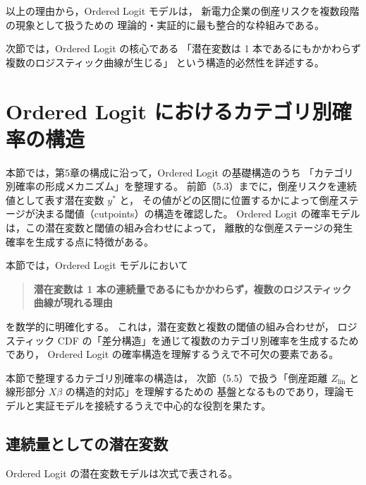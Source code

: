 以上の理由から，Ordered Logit モデルは，
新電力企業の倒産リスクを複数段階の現象として扱うための
理論的・実証的に最も整合的な枠組みである。

次節では，Ordered Logit の核心である
「潜在変数は 1 本であるにもかかわらず複数のロジスティック曲線が生じる」
という構造的必然性を詳述する。



\section{Ordered Logit におけるカテゴリ別確率の構造}
\label{sec:ordered_logit_core}

本節では，第5章の構成に沿って，Ordered Logit の基礎構造のうち
「カテゴリ別確率の形成メカニズム」を整理する。
前節（5.3）までに，倒産リスクを連続値として表す潜在変数 $y^*$ と，
その値がどの区間に位置するかによって倒産ステージが決まる閾値（cutpoints）の構造を確認した。
Ordered Logit の確率モデルは，この潜在変数と閾値の組み合わせによって，
離散的な倒産ステージの発生確率を生成する点に特徴がある。

本節では，Ordered Logit モデルにおいて

\begin{quote}
\textbf{潜在変数は 1 本の連続量であるにもかかわらず，複数のロジスティック曲線が現れる理由}
\end{quote}

を数学的に明確化する。
これは，潜在変数と複数の閾値の組み合わせが，
ロジスティック CDF の「差分構造」を通じて複数のカテゴリ別確率を生成するためであり，
Ordered Logit の確率構造を理解するうえで不可欠の要素である。

本節で整理するカテゴリ別確率の構造は，
次節（5.5）で扱う「倒産距離 $Z_{\text{lin}}$ と線形部分 $X\beta$ の構造的対応」を理解するための
基盤となるものであり，理論モデルと実証モデルを接続するうえで中心的な役割を果たす。



\subsection{連続量としての潜在変数}

Ordered Logit の潜在変数モデルは次式で表される。


